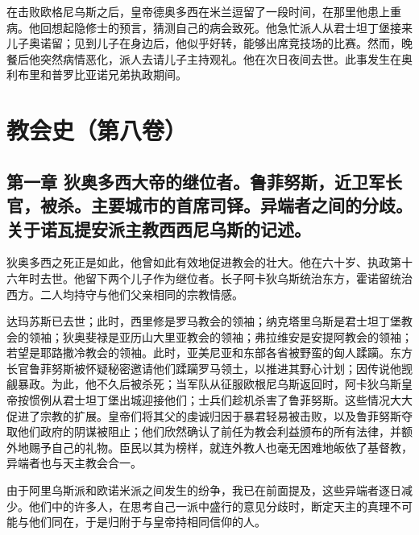 在击败欧格尼乌斯之后，皇帝德奥多西在米兰逗留了一段时间，在那里他患上重病。他回想起隐修士的预言，猜测自己的病会致死。他急忙派人从君士坦丁堡接来儿子奥诺留；见到儿子在身边后，他似乎好转，能够出席竞技场的比赛。然而，晚餐后他突然病情恶化，派人去请儿子主持观礼。他在次日夜间去世。此事发生在奥利布里和普罗比亚诺兄弟执政期间。\par



\section{教会史（第八卷）}


\subsection{第一章  狄奥多西大帝的继位者。鲁菲努斯，近卫军长官，被杀。主要城市的首席司铎。异端者之间的分歧。关于诺瓦提安派主教西西尼乌斯的记述。}

狄奥多西之死正是如此，他曾如此有效地促进教会的壮大。他在六十岁、执政第十六年时去世。他留下两个儿子作为继位者。长子阿卡狄乌斯统治东方，霍诺留统治西方。二人均持守与他们父亲相同的宗教情感。\par

达玛苏斯已去世；此时，西里修是罗马教会的领袖；纳克塔里乌斯是君士坦丁堡教会的领袖；狄奥斐禄是亚历山大里亚教会的领袖；弗拉维安是安提阿教会的领袖；若望是耶路撒冷教会的领袖。此时，亚美尼亚和东部各省被野蛮的匈人蹂躏。东方长官鲁菲努斯被怀疑秘密邀请他们蹂躏罗马领土，以推进其野心计划；因传说他觊觎暴政。为此，他不久后被杀死；当军队从征服欧根尼乌斯返回时，阿卡狄乌斯皇帝按惯例从君士坦丁堡出城迎接他们；士兵们趁机杀害了鲁菲努斯。这些情况大大促进了宗教的扩展。皇帝们将其父的虔诚归因于暴君轻易被击败，以及鲁菲努斯夺取他们政府的阴谋被阻止；他们欣然确认了前任为教会利益颁布的所有法律，并额外地赐予自己的礼物。臣民以其为榜样，就连外教人也毫无困难地皈依了基督教，异端者也与天主教会合一。\par

由于阿里乌斯派和欧诺米派之间发生的纷争，我已在前面提及，这些异端者逐日减少。他们中的许多人，在思考自己一派中盛行的意见分歧时，断定天主的真理不可能与他们同在，于是归附于与皇帝持相同信仰的人。\par


